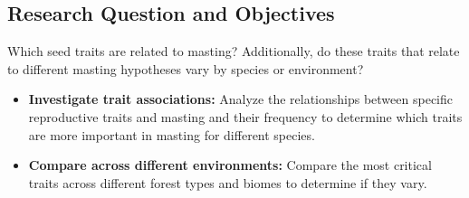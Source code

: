 \documentclass[11pt,letter]{article}
\begin{document}
\subsection{Research Question and Objectives}
Which seed traits are related to masting? Additionally, do these traits that relate to different masting hypotheses vary by species or environment?
	\begin{itemize}
	\item \textbf{Investigate trait associations:} Analyze the relationships between specific reproductive traits and masting and their frequency to determine which traits are more important in masting for different species.
	\item \textbf{Compare across different environments:} Compare the most critical traits across different forest types and biomes to determine if they vary.
	\end{itemize}
\end{document}
